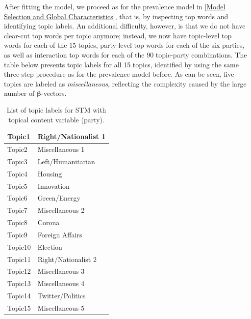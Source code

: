 After fitting the model, we proceed as for the prevalence model in \ref{Model Selection and Global Characteristics}, that is, by inspecting top words and identifying topic labels. An additional difficulty, however, is that we do not have clear-cut top words per topic anymore; instead, we now have topic-level top words for each of the 15 topics, party-level top words for each of the six parties, as well as interaction top words for each of the 90 topic-party combinations. The table below presents topic labels for all 15 topics, identified by using the same three-step procedure as for the prevalence model before. As can be seen, five topics are labeled as \textit{miscellaneous}, reflecting the complexity caused by the large number of $\boldsymbol{\beta}$-vectors.

\begin{table}[h!]
	\centering
	\captionsetup{justification=centering,margin=2cm}
	\begin{tabular}{|l|l|}
	\hline
	Topic1  & Right/Nationalist 1  \\ \hline
	Topic2  & Miscellaneous 1      \\ \hline
	Topic3  & Left/Humanitarian    \\ \hline
	Topic4  & Housing       	   \\ \hline
	Topic5  & Innovation           \\ \hline
	Topic6  & Green/Energy         \\ \hline
	Topic7  & Miscellaneous 2      \\ \hline
	Topic8  & Corona               \\ \hline
	Topic9  & Foreign Affairs      \\ \hline
	Topic10 & Election             \\ \hline
	Topic11 & Right/Nationalist 2  \\ \hline
	Topic12 & Miscellaneous 3      \\ \hline
	Topic13 & Miscellaneous 4      \\ \hline
	Topic14 & Twitter/Politics     \\ \hline
	Topic15 & Miscellaneous 5      \\ \hline
	\end{tabular}
	\caption{List of topic labels for STM with topical content variable (party).}
	\label{Tab:labels_content}
\end{table}


